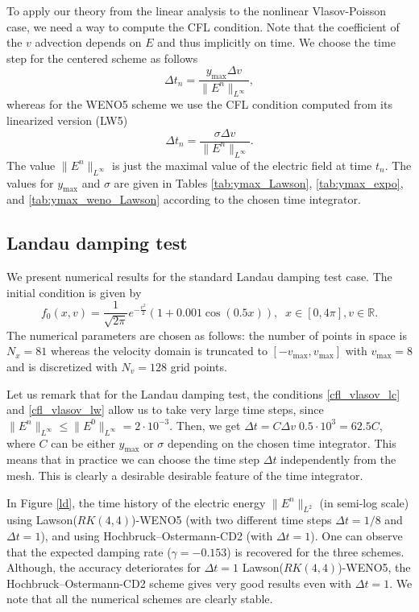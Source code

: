 To apply our theory from the linear analysis to the nonlinear Vlasov-Poisson case, we need a way to compute the CFL condition. Note that the coefficient of the $v$ advection depends on $E$ and thus implicitly on time. We choose the time step for the centered scheme as follows
\begin{equation}
  \label{cfl_vlasov_lc}
  \Delta t_n = \frac{y_{\max} \Delta v}{\| E^n \|_{L^\infty}}, 
\end{equation}
whereas for the WENO5 scheme we use the CFL condition computed from its linearized version (LW5)
\begin{equation}
  \label{cfl_vlasov_lw}
  \Delta t_n = \frac{\sigma \Delta v}{\| E^n \|_{L^\infty}}.
\end{equation}
The value $\| E^n \|_{L^\infty}$ is just the maximal value of the electric field at time $t_n$. The values for  $y_{\max}$ and $\sigma$ are given in Tables \ref{tab:ymax_Lawson}, \ref{tab:ymax_expo}, and \ref{tab:ymax_weno_Lawson} according to the chosen time integrator. 



\subsection{Landau damping test}

We present numerical results for the standard Landau damping test case. The initial condition is given by
$$
  f_0(x, v) = \frac{1}{\sqrt{2\pi}} e^{-\frac{v^2}{2}} (1+0.001 \cos(0.5 x)), \;\; x\in [0, 4\pi], v\in \mathbb{R}. 
$$
The numerical parameters are chosen as follows: the number of points in space is $N_x=81$ whereas the velocity domain is truncated to $[-v_{\max}, v_{\max}]$ with $v_{\max}=8$ and is discretized with $N_v=128$ grid points.

Let us remark that for the Landau damping test, the conditions \eqref{cfl_vlasov_lc} and \eqref{cfl_vlasov_lw} allow us to take very large time steps, since $\| E^n \|_{L^\infty} \leq \| E^0 \|_{L^\infty} = 2\cdot 10^{-3}$. Then, we get $\Delta t = C \Delta v \; 0.5\cdot 10^3 =  62.5 C$, where $C$ can be either $y_{\max}$ or $\sigma$ depending on the chosen time integrator. This means that in practice we can choose the time step $\Delta t$ independently from the mesh. This is clearly a desirable desirable feature of the time integrator.

In Figure \ref{ld}, the time history of the electric energy $\|E^n\|_{L^2}$ (in semi-log scale) using Lawson($RK(4, 4)$)-WENO5 (with two different time steps $\Delta t=1/8$ and $\Delta t=1$), and using Hochbruck--Ostermann-CD2 (with $\Delta t=1$). One can observe that the expected damping rate ($\gamma=-0.153$) is recovered for the three schemes. Although, the accuracy deteriorates for $\Delta t=1$ Lawson($RK(4, 4)$)-WENO5, the Hochbruck--Ostermann-CD2 scheme gives very good results even with $\Delta t=1$. We note that all the numerical schemes are clearly stable.


